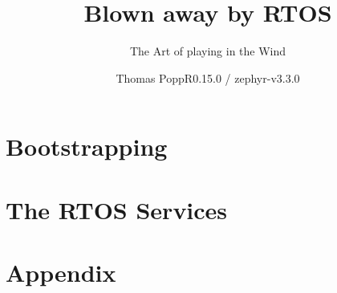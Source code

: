 \documentclass[11pt,fleqn]{book}
\title{Blown away by \Zephyr RTOS}
\author{Thomas Popp\hfill \normalsize{R0.15.0 / zephyr-v3.3.0}}
\subtitle{The Art of playing in the Wind}
\begin{document}
    
    \mnfrontpage

    \tableofcontents
    
    \part{Bootstrapping}
    
    
 
    \part{The RTOS Services}
    
    
    \part{Appendix}
    \appendix
    
\end{document}
